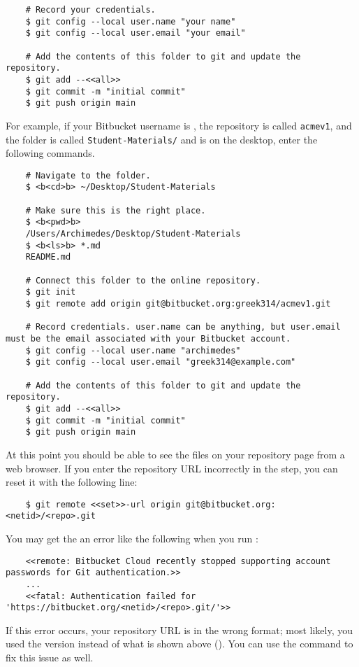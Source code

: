 \begin{enumerate}
\begin{lstlisting}
    # Record your credentials.
    $ git config --local user.name "your name"
    $ git config --local user.email "your email"
    
    # Add the contents of this folder to git and update the repository.
    $ git add --<<all>>
    $ git commit -m "initial commit"
    $ git push origin main
    \end{lstlisting}
    
    For example, if your Bitbucket username is , the repository is called \texttt{acmev1}, and the folder is called \texttt{Student-Materials/} and is on the desktop, enter the following commands.
    
    \begin{lstlisting}
    # Navigate to the folder.
    $ <b<cd>b> ~/Desktop/Student-Materials
    
    # Make sure this is the right place.
    $ <b<pwd>b>
    /Users/Archimedes/Desktop/Student-Materials
    $ <b<ls>b> *.md
    README.md
    
    # Connect this folder to the online repository.
    $ git init
    $ git remote add origin git@bitbucket.org:greek314/acmev1.git
    
    # Record credentials. user.name can be anything, but user.email must be the email associated with your Bitbucket account.
    $ git config --local user.name "archimedes"
    $ git config --local user.email "greek314@example.com"
    
    # Add the contents of this folder to git and update the repository.
    $ git add --<<all>>
    $ git commit -m "initial commit"
    $ git push origin main
    \end{lstlisting}
    
    At this point you should be able to see the files on your repository page from a web browser.
    If you enter the repository URL incorrectly in the  step, you can reset it with the following line:
    \begin{lstlisting}
    $ git remote <<set>>-url origin git@bitbucket.org:<netid>/<repo>.git
    \end{lstlisting}
    \begin{info}
    You may get the an error like the following when you run :
    \begin{lstlisting}
    <<remote: Bitbucket Cloud recently stopped supporting account passwords for Git authentication.>>
    ...
    <<fatal: Authentication failed for 'https://bitbucket.org/<netid>/<repo>.git/'>>
    \end{lstlisting}
    If this error occurs, your repository URL is in the wrong format; most likely, you used the  version instead of what is shown above ().
    You can use the  command to fix this issue as well.
    \end{info}
    

\end{enumerate}
